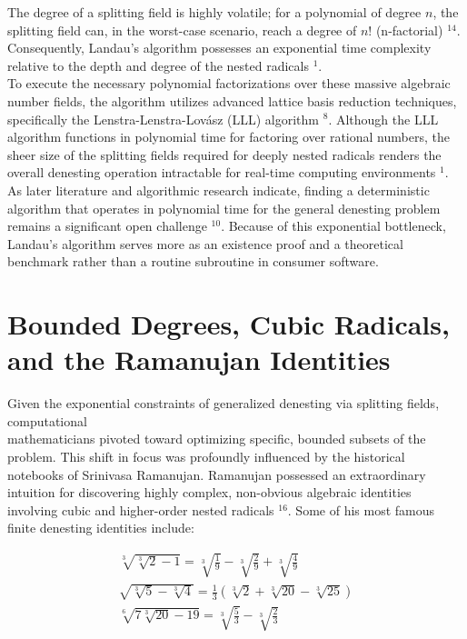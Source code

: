 \documentclass[10pt]{article}
\begin{document}
The degree of a splitting field is highly volatile; for a polynomial of degree $n$, the splitting field can, in the worst-case scenario, reach a degree of $n!$ (n-factorial) ${ }^{14}$. Consequently, Landau's algorithm possesses an exponential time complexity relative to the depth and degree of the nested radicals ${ }^{1}$.\\
To execute the necessary polynomial factorizations over these massive algebraic number fields, the algorithm utilizes advanced lattice basis reduction techniques, specifically the Lenstra-Lenstra-Lovász (LLL) algorithm ${ }^{8}$. Although the LLL algorithm functions in polynomial time for factoring over rational numbers, the sheer size of the splitting fields required for deeply nested radicals renders the overall denesting operation intractable for real-time computing environments ${ }^{1}$. As later literature and algorithmic research indicate, finding a deterministic algorithm that operates in polynomial time for the general denesting problem remains a significant open challenge ${ }^{10}$. Because of this exponential bottleneck, Landau's algorithm serves more as an existence proof and a theoretical benchmark rather than a routine subroutine in consumer software.

\section*{Bounded Degrees, Cubic Radicals, and the Ramanujan Identities}
Given the exponential constraints of generalized denesting via splitting fields, computational\\
mathematicians pivoted toward optimizing specific, bounded subsets of the problem. This shift in focus was profoundly influenced by the historical notebooks of Srinivasa Ramanujan. Ramanujan possessed an extraordinary intuition for discovering highly complex, non-obvious algebraic identities involving cubic and higher-order nested radicals ${ }^{16}$. Some of his most famous finite denesting identities include:

$$
\begin{gathered}
\sqrt[3]{\sqrt[3]{2}-1}=\sqrt[3]{\frac{1}{9}}-\sqrt[3]{\frac{2}{9}}+\sqrt[3]{\frac{4}{9}} \\
\sqrt{\sqrt[3]{5}-\sqrt[3]{4}}=\frac{1}{3}(\sqrt[3]{2}+\sqrt[3]{20}-\sqrt[3]{25}) \\
\sqrt[6]{7 \sqrt[3]{20}-19}=\sqrt[3]{\frac{5}{3}}-\sqrt[3]{\frac{2}{3}}
\end{gathered}
$$
\end{document}

